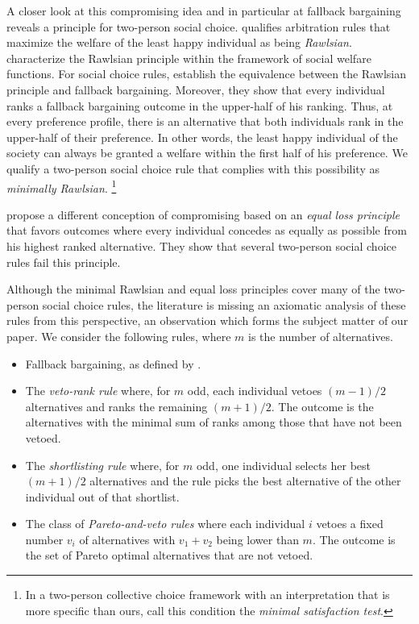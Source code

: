 \documentclass[version=3.21, pagesize, twoside=off, bibliography=totoc, DIV=calc, fontsize=12pt, a4paper]{scrartcl}
\begin{document}
A closer look at this compromising idea and in particular at fallback bargaining reveals a principle for two-person social choice.  qualifies arbitration rules that maximize the welfare of the least happy individual as being \textit{Rawlsian}. \citet{congar2012characterization} characterize the Rawlsian principle within the framework of social welfare functions. For social choice rules, \citet{BramsKilgour2001} establish the equivalence between the Rawlsian principle and fallback bargaining. Moreover, they show that every individual ranks a fallback bargaining outcome in the upper-half of his ranking. Thus, at every preference profile, there is an alternative that both individuals rank in the upper-half of their preference. In other words, the least happy individual of the society can always be granted a welfare within the first half of his preference. We qualify a two-person social choice rule that complies with this possibility as \textit{minimally Rawlsian}.%
\footnote{In a two-person collective choice framework with an interpretation that is more specific than ours, \citet{Clippel} call this condition the \textit{minimal satisfaction test}.}

 propose a different conception of compromising based on an \textit{equal loss principle} that favors outcomes where every individual concedes as equally as possible from his highest ranked alternative. They show that several two-person social choice rules fail this principle.

Although the minimal Rawlsian and equal loss principles cover many of the two-person social choice rules, the literature is missing an axiomatic analysis of these rules from this perspective, an observation which forms the subject matter of our paper. We consider the following rules, where $m$ is the number of alternatives.
\begin{itemize}
	\item Fallback bargaining, as defined by \citet{BramsKilgour2001}.
	\item The \textit{veto-rank rule} where, for $m$ odd, each individual vetoes $(m - 1) / 2$ alternatives and ranks the remaining $(m+1) / 2$. The outcome is the alternatives with the minimal sum of ranks among those that have not been vetoed.
	\item The \textit{shortlisting rule} where, for $m$ odd, one individual selects her best $(m+1) / 2$ alternatives and the rule picks the best alternative of the other individual out of that shortlist.
	\item The class of \textit{Pareto-and-veto rules} where each individual $i$ vetoes a fixed number $v_i$ of alternatives with $v_1 + v_2$ being lower than $m$. The outcome is the set of Pareto optimal alternatives that are not vetoed. 
\end{itemize}
\end{document}
